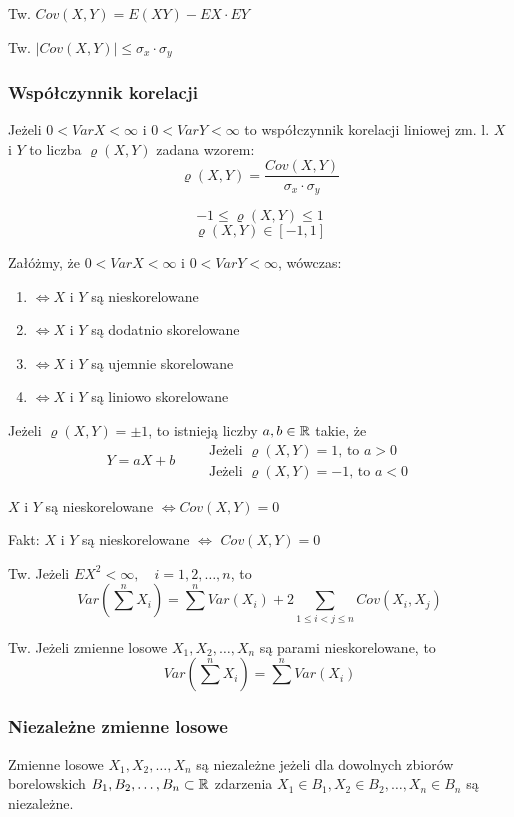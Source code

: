 \documentclass[../Matematyka.tex]{subfiles}
\begin{document}
Tw. \(Cov(X,Y) = E(XY) - EX \cdot EY\)

Tw. \(|Cov(X,Y)| \leq \sigma_x \cdot \sigma_y\)

\subsubsection*{Współczynnik korelacji}
Jeżeli \(0 < VarX < \infty\) i \(0 < VarY < \infty\) to współczynnik korelacji liniowej zm. l. \(X\) i \(Y\) to liczba \(\varrho(X,Y)\) zadana wzorem:
\[\varrho(X,Y) = \frac{Cov(X,Y)}{\sigma_x \cdot \sigma_y}\]

\[-1 \leq \varrho(X,Y) \leq 1\]
\[\varrho(X,Y) \in [-1,1]\]

Załóżmy, że \(0 < VarX < \infty\) i \(0 < VarY < \infty\), wówczas:
\begin{enumerate}[label=(\roman*)]
    \item {} \(\iff X\) i \(Y\) są nieskorelowane
    \item {} \(\iff X\) i \(Y\) są dodatnio skorelowane
    \item {} \(\iff X\) i \(Y\) są ujemnie skorelowane
    \item {} \(\iff X\) i \(Y\) są liniowo skorelowane
\end{enumerate}

Jeżeli \(\varrho(X,Y) = \pm 1\), to istnieją liczby \(a, b \in \mathbb{R}\) takie, że
\[Y = aX + b \qquad
    \substack{
        \text{Jeżeli } \varrho(X,Y) = 1 \text{, to } a > 0\\
        \text{Jeżeli } \varrho(X,Y) = -1 \text{, to } a < 0
    }\]

\(X\) i \(Y\) są nieskorelowane \(\iff Cov(X,Y) = 0\)

Fakt: \(X\) i \(Y\) są nieskorelowane \(\iff\) \(Cov(X,Y) = 0\)

Tw. Jeżeli \(EX^2 < \infty, \quad i = 1, 2, \ldots, n\), to
\[Var(\sum^{n} X_i) = \sum^{n} Var(X_i) + 2 \!\!\!\! \sum_{1 \leq i < j \leq n} \!\!\!\! Cov(X_i, X_j)\]

Tw. Jeżeli zmienne losowe \(X_1, X_2, \ldots, X_n\) są parami nieskorelowane, to
\[Var(\sum^{n} X_i) = \sum^{n} Var(X_i)\]

\subsubsection{Niezależne zmienne losowe}
Zmienne losowe \(X_1, X_2, \ldots, X_n\) są niezależne jeżeli dla dowolnych zbiorów borelowskich \(B_1, B_2, \ldots, B_n \subset \mathbb{R}\) zdarzenia \({X_1 \in B_1}, {X_2 \in B_2}, \ldots, {X_n \in B_n}\) są niezależne.
\end{document}
